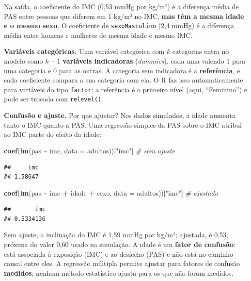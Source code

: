 \documentclass[
]{book}
\newenvironment{Shaded}{\begin{snugshade}}{\end{snugshade}}
\newcommand{\AttributeTok}[1]{\textcolor[rgb]{0.13,0.29,0.53}{#1}}
\newcommand{\CommentTok}[1]{\textcolor[rgb]{0.56,0.35,0.01}{\textit{#1}}}
\newcommand{\FunctionTok}[1]{\textcolor[rgb]{0.13,0.29,0.53}{\textbf{#1}}}
\newcommand{\NormalTok}[1]{#1}
\newcommand{\SpecialCharTok}[1]{\textcolor[rgb]{0.81,0.36,0.00}{\textbf{#1}}}
\newcommand{\StringTok}[1]{\textcolor[rgb]{0.31,0.60,0.02}{#1}}
\begin{document}
Na saída, o coeficiente do IMC (0,53 mmHg por kg/m²) é a diferença média de PAS entre pessoas que diferem em 1 kg/m² no IMC, \textbf{mas têm a mesma idade e o mesmo sexo}. O coeficiente de \texttt{sexoMasculino} (2,4 mmHg) é a diferença média entre homens e mulheres de mesma idade e mesmo IMC.

\textbf{Variáveis categóricas.} Uma variável categórica com \(k\) categorias entra no modelo como \(k - 1\) \textbf{variáveis indicadoras} (\emph{dummies}), cada uma valendo 1 para uma categoria e 0 para as outras. A categoria sem indicadora é a \textbf{referência}, e cada coeficiente compara a sua categoria com ela. O R faz isso automaticamente para variáveis do tipo \texttt{factor}; a referência é o primeiro nível (aqui, ``Feminino'') e pode ser trocada com \texttt{relevel()}.

\textbf{Confusão e ajuste.} Por que ajustar? Nos dados simulados, a idade aumenta tanto o IMC quanto a PAS. Uma regressão simples da PAS sobre o IMC atribui ao IMC parte do efeito da idade:

\begin{Shaded}
\begin{Highlighting}[]
\FunctionTok{coef}\NormalTok{(}\FunctionTok{lm}\NormalTok{(pas }\SpecialCharTok{\textasciitilde{}}\NormalTok{ imc, }\AttributeTok{data =}\NormalTok{ adultos))[}\StringTok{"imc"}\NormalTok{]              }\CommentTok{\# sem ajuste}
\end{Highlighting}
\end{Shaded}

\begin{verbatim}
##     imc 
## 1.58647
\end{verbatim}

\begin{Shaded}
\begin{Highlighting}[]
\FunctionTok{coef}\NormalTok{(}\FunctionTok{lm}\NormalTok{(pas }\SpecialCharTok{\textasciitilde{}}\NormalTok{ imc }\SpecialCharTok{+}\NormalTok{ idade }\SpecialCharTok{+}\NormalTok{ sexo, }\AttributeTok{data =}\NormalTok{ adultos))[}\StringTok{"imc"}\NormalTok{]  }\CommentTok{\# ajustado}
\end{Highlighting}
\end{Shaded}

\begin{verbatim}
##       imc 
## 0.5334136
\end{verbatim}

Sem ajuste, a inclinação do IMC é 1,59 mmHg por kg/m²; ajustada, é 0,53, próxima do valor 0,60 usado na simulação. A idade é um \textbf{fator de confusão}: está associada à exposição (IMC) e ao desfecho (PAS) e não está no caminho causal entre eles. A regressão múltipla permite ajustar para fatores de confusão \textbf{medidos}; nenhum método estatístico ajusta para os que não foram medidos.
\end{document}
